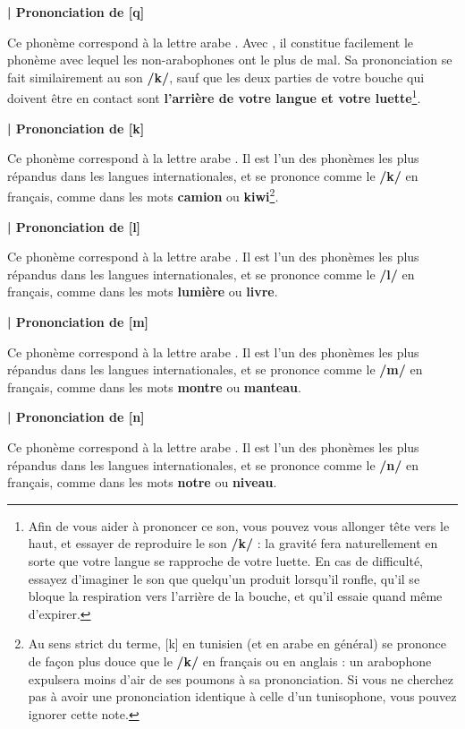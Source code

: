 \textbf{| Prononciation de   [q]}

Ce phonème correspond à la lettre arabe . Avec , il constitue facilement le phonème avec lequel les non-arabophones ont le plus de mal. Sa prononciation se fait similairement au son \textbf{/k/}, sauf que les deux parties de votre bouche qui doivent être en contact sont \textbf{l'arrière de votre langue et votre luette}\footnote{Afin de vous aider à prononcer ce son, vous pouvez vous allonger tête vers le haut, et essayer de reproduire le son \textbf{/k/} : la gravité fera naturellement en sorte que votre langue se rapproche de votre luette. En cas de difficulté, essayez d'imaginer le son que quelqu'un produit lorsqu'il ronfle, qu'il se bloque la respiration vers l'arrière de la bouche, et qu'il essaie quand même d'expirer.}.


\textbf{| Prononciation de   [k]}

Ce phonème correspond à la lettre arabe . Il est l'un des phonèmes les plus répandus dans les langues internationales, et se prononce comme le \textbf{/k/} en français, comme dans les mots \textbf{camion} ou \textbf{kiwi}\footnote{Au sens strict du terme,  [k] en tunisien (et en arabe en général) se prononce de façon plus douce que le \textbf{/k/} en français ou en anglais : un arabophone expulsera moins d'air de ses poumons à sa prononciation. Si vous ne cherchez pas à avoir une prononciation identique à celle d'un tunisophone, vous pouvez ignorer cette note.}.


\textbf{| Prononciation de   [l]}

Ce phonème correspond à la lettre arabe . Il est l'un des phonèmes les plus répandus dans les langues internationales, et se prononce comme le \textbf{/l/} en français, comme dans les mots \textbf{lumière} ou \textbf{livre}.


\textbf{| Prononciation de   [m]}

Ce phonème correspond à la lettre arabe . Il est l'un des phonèmes les plus répandus dans les langues internationales, et se prononce comme le \textbf{/m/} en français, comme dans les mots \textbf{montre} ou \textbf{manteau}.


\textbf{| Prononciation de   [n]}

Ce phonème correspond à la lettre arabe . Il est l'un des phonèmes les plus répandus dans les langues internationales, et se prononce comme le \textbf{/n/} en français, comme dans les mots \textbf{notre} ou \textbf{niveau}.


